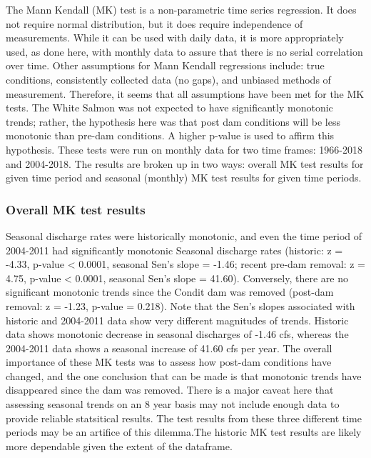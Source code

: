 \documentclass[
  12pt,
]{article}
\begin{document}
The Mann Kendall (MK) test is a non-parametric time series regression.
It does not require normal distribution, but it does require
independence of measurements. While it can be used with daily data, it
is more appropriately used, as done here, with monthly data to assure
that there is no serial correlation over time. Other assumptions for
Mann Kendall regressions include: true conditions, consistently
collected data (no gaps), and unbiased methods of measurement.
Therefore, it seems that all assumptions have been met for the MK tests.
The White Salmon was not expected to have significantly monotonic
trends; rather, the hypothesis here was that post dam conditions will be
less monotonic than pre-dam conditions. A higher p-value is used to
affirm this hypothesis. These tests were run on monthly data for two
time frames: 1966-2018 and 2004-2018. The results are broken up in two
ways: overall MK test results for given time period and seasonal
(monthly) MK test results for given time periods.

\hypertarget{overall-mk-test-results}{%
\subsubsection{Overall MK test results}\label{overall-mk-test-results}}

Seasonal discharge rates were historically monotonic, and even the time
period of 2004-2011 had significantly monotonic Seasonal discharge rates
(historic: z = -4.33, p-value \textless{} 0.0001, seasonal Sen's slope =
-1.46; recent pre-dam removal: z = 4.75, p-value \textless{} 0.0001,
seasonal Sen's slope = 41.60). Conversely, there are no significant
monotonic trends since the Condit dam was removed (post-dam removal: z =
-1.23, p-value = 0.218). Note that the Sen's slopes associated with
historic and 2004-2011 data show very different magnitudes of trends.
Historic data shows monotonic decrease in seasonal discharges of -1.46
cfs, whereas the 2004-2011 data shows a seasonal increase of 41.60 cfs
per year. The overall importance of these MK tests was to assess how
post-dam conditions have changed, and the one conclusion that can be
made is that monotonic trends have disappeared since the dam was
removed. There is a major caveat here that assessing seasonal trends on
an 8 year basis may not include enough data to provide reliable
statsitical results. The test results from these three different time
periods may be an artifice of this dilemma.The historic MK test results
are likely more dependable given the extent of the dataframe.
\end{document}
